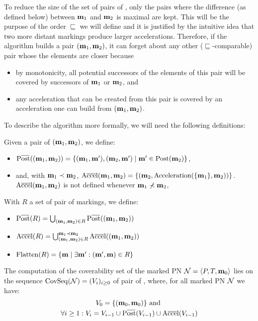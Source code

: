 To reduce the size of the set of pairs of \omarks, only the pairs where the difference (as defined below) between $\mathbf{m}_1$ and $\mathbf{m}_2$ is maximal are kept.
This will be the purpose of the order $\sqsubseteq$ we will define and it is justified by the intuitive idea that two more distant markings produce larger accelerations.
Therefore, if the algorithm builds a pair $(\mathbf{m}_1, \mathbf{m}_2)$, it can forget about any other ($\sqsubseteq$-comparable) pair whose the elements are closer because
\begin{itemize}
  \item by monotonicity, all potential successors of the elements of this pair will be covered by successors of $\mathbf{m}_1$ or $\mathbf{m}_2$, and
  \item any acceleration that can be created from this pair is covered by an acceleration one can build from $(\mathbf{m}_1, \mathbf{m}_2)$.
\end{itemize}

To describe the algorithm more formally, we will need the following definitions:

Given a pair of \omarks $(\mathbf{m}_1, \mathbf{m}_2)$, we define:
\begin{itemize}
  \item $\Postb((\mar_1, \mar_2)) = \{(\mar_1, \marp), (\mar_2, \marp) \mid \marp \in \Post(\mar_2)\}$,
  \item and, with $\mathbf{m}_1 \prec \mathbf{m}_2$, $\operatorname{A\overline{cce}l}(\mathbf{m}_1, \mathbf{m}_2) = \{(\mathbf{m}_2, \operatorname{Acceleration}(\{\mathbf{m}_1\}, \mathbf{m}_2))\}$.
    $\operatorname{A\overline{cce}l}(\mathbf{m}_1, \mathbf{m}_2)$ is not defined whenever $\mathbf{m}_1 \nprec \mathbf{m}_2$,
\end{itemize}

With $R$ a set of pair of markings, we define:
\begin{itemize}
  \item $\Postb(R) = \bigcup_{(\mar_1, \mar_2) \in R} \Postb((\mar_1, \mar_2))$
  \item $\operatorname{A\overline{cce}l}(R) = \bigcup_{(\mathbf{m}_1, \mathbf{m}_2) \in R}^{\mathbf{m}_1 \prec \mathbf{m}_2} \operatorname{A\overline{cce}l}((\mathbf{m}_1, \mathbf{m}_2))$
  \item $\operatorname{Flatten}(R) = \{\mathbf{m} \mid \exists \mathbf{m'} : (\mathbf{m'}, \mathbf{m}) \in R\}$
\end{itemize}

The computation of the coverability set of the marked \ac{PN} $\mathcal{N} = \langle P,T, \mathbf{m}_0\rangle$ lies on the sequence $\operatorname{CovSeq}(\mathcal{N}) = (V_i)_{i \geq 0}$ of pair of \omarks, where, for all marked \ac{PN} $\mathcal{N}$ we have:
\begin{gather*}
  V_0 = \{(\mari, \mari)\} \text{ and } \\
  \forall i \geq 1 : V_i = V_{i-1} \cup \Postb(V_{i-1}) \cup \Accelb(V_{i-1})
\end{gather*}

